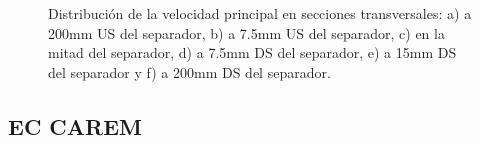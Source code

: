 \documentclass[9pt,mathserif]{beamer}
\begin{document}
{\begin{textblock}{12}
\begin{figure}[ht]
        \caption{Distribución de la velocidad principal en secciones transversales: a) a 200mm US del separador, b) a 7.5mm US del separador, c) en la mitad del separador, d) a 7.5mm DS del separador, e) a 15mm DS del separador y f) a 200mm DS del separador.}
  \end{figure}
  \end{textblock}
}

\subsection{EC CAREM}
  


\end{document}
